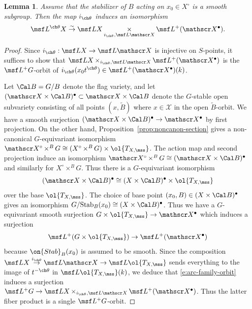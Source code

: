 \documentclass[final]{amsart}
\newtheorem{lem}[subsubsection]{Lemma}
\theoremstyle{remark}
\theoremstyle{definition}
\DeclareMathOperator*{\xt}{\times}
\numberwithin{equation}{section}
\begin{document}
\begin{lem}  \label{lem:theta-orbit-identification}
Assume that the stabilizer of $B$ acting on $x_0 \in X^\circ$ is a smooth subgroup. 
Then the map $i_{\ch\theta}$ induces an isomorphism 
\[ \msf L^{\ch\theta} X \overset\sim\to \msf L X \xt_{i_{\ch\theta}, \msf L \mathscr X} \msf L^+(\mathscr X^\bullet).
\]
\end{lem}
\begin{proof}
Since $i_{\ch\theta} : \msf L X \to \msf L \mathscr X$ is injective on $S$-points,
it suffices to show that 
$\msf L X \xt_{i_{\ch\theta}, \msf L \mathscr X} \msf L^+(\mathscr X^\bullet)$
is the $\msf L^+G$-orbit of $i_{\ch\theta}(x_0 t^{\ch\theta}) \in \msf L^+(\mathscr X^\bullet)(k)$.

Let $\Cal B = G/B$ denote the flag variety, and let
$(\mathscr X \times \Cal B)^\bullet \subset \mathscr X \times \Cal B$ denote 
the $G$-stable open subvariety 
consisting of all points $(x,\tilde B)$ where $x \in \mathscr X$ in the open $\tilde B$-orbit.
We have a smooth surjection $(\mathscr X\times \Cal B)^\bullet \to \mathscr X^\bullet$ by
first projection. 
On the other hand, Proposition~\ref{prop:noncanon-section} 
gives a non-canonical $G$-equivariant isomorphism 
$\mathscr X^\circ \xt^B G \cong (X^\circ \xt^B G) \times \ol{T_{X,\mss}}$. 
The action map and second projection induce an isomorphism 
$\mathscr X^\circ \xt^B G \cong (\mathscr X \times \Cal B)^\bullet$ and 
similarly for $X^\circ \xt^B G$. 
Thus there is a $G$-equivariant
isomorphism 
\[ (\mathscr X\times \Cal B)^\bullet \cong (X \times \Cal B)^\bullet \times \ol{T_{X,\mss}} \] 
over the base $\ol{T_{X,\mss}}$. 
The choice of base point $(x_0,B) \in (X \times \Cal B)^\bullet$ gives
an isomorphism $G/\textnormal{Stab}_B(x_0) \cong (X \times \Cal B)^\bullet$. 
Thus we have a $G$-equivariant smooth surjection 
$G \times \ol{T_{X,\mss}} \to \mathscr X^\bullet$ which induces
a surjection 
\begin{equation} \label{e:arc-family-orbit}
    \msf L^+( G \times \ol{T_{X,\mss}} ) \to \msf L^+ (\mathscr X^\bullet)
\end{equation}
because $\on{Stab}_B(x_0)$ is assumed to be smooth. 
Since the composition 
$\msf L X \overset{i_{\ch\theta}}\to \msf L \mathscr X \to \msf L \ol{T_{X,\mss}}$ 
sends everything to the image of $t^{-\ch\theta}$ in $\msf L\ol{T_{X,\mss}}(k)$, 
we deduce that \eqref{e:arc-family-orbit} induces a 
surjection 
$\msf L^+G \to \msf L X \xt_{i_{\ch\theta}, \msf L \mathscr X} \msf L^+(\mathscr X^\bullet)$.
Thus the latter fiber product is a single $\msf L^+G$-orbit.
\end{proof}
\end{document}
